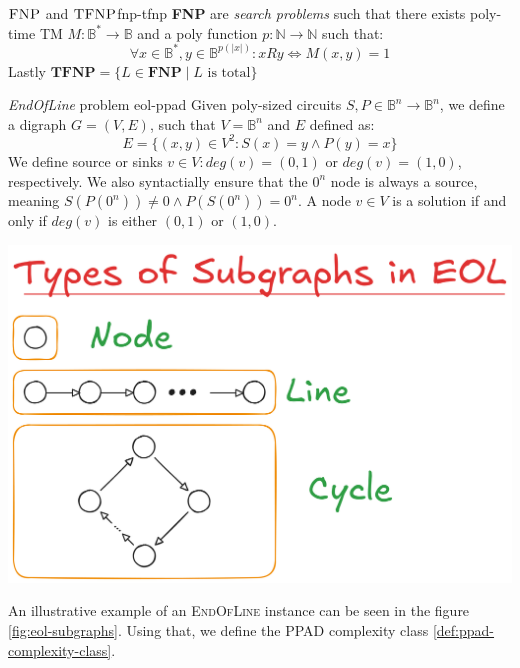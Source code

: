 \begin{definitionbox}{$\textnormal{\textsc{FNP}}$ and $\textnormal{\textsc{TFNP}}$}{fnp-tfnp}
    \textbf{FNP} are \textit{search problems} such that there exists poly-time TM $M: \mathbb{B}^* \to \mathbb{B}$
    and a poly function $p : \mathbb{N} \to \mathbb{N}$ such that:
    $$
    \forall x \in \mathbb{B}^*, y \in \mathbb{B}^{p(|x|)}: xRy \iff M(x,y) = 1
    $$
    Lastly $\textbf{TFNP} = \{L \in \textbf{FNP} \mid L \text{ is total}\}$
\end{definitionbox}
 

\begin{minipage}{0.55\linewidth}
\begin{definitionbox}{\textit{EndOfLine} problem \cite{papadimitriou_ComplexityParityArgument_1994}}{eol-ppad}
    Given poly-sized circuits $S, P \in \mathbb{B}^n \to \mathbb{B}^n$,
    we define a digraph $G = (V,E)$, such that $V= \mathbb{B}^n$ and $E$ defined as:
    $$
    E = \{(x,y) \in V^2: S(x) = y \wedge P(y) = x\}
    $$
    We define source or sinks $v \in V: \textit{deg}(v) = (0,1)$ or
    $\textit{deg}(v) = (1,0)$, respectively. 
    We also syntactially ensure that the $0^n$ node is always a source, meaning
    $S(P(0^n)) \neq 0 \wedge P(S(0^n)) = 0^n$.
    A node $v \in V$ is a solution if and only if $\textit{deg}(v)$ is either
    $(0,1)$  or $(1,0)$.
\end{definitionbox}
\end{minipage}
\begin{minipage}{0.45\linewidth}
    \centering
    \includegraphics[width=0.7\linewidth]{assets/eol-subgraphs.png}
    \label{fig:eol-subgraphs}
\end{minipage}

\vspace{0.2cm}

An illustrative example of an \textsc{EndOfLine} instance can be seen in the figure \ref{fig:eol-subgraphs}. 
Using that, we define the \textsc{PPAD} complexity class \ref{def:ppad-complexity-class}.


